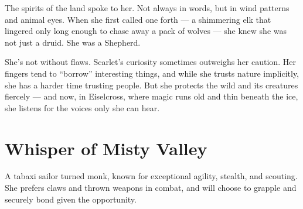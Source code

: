 \documentclass[
  letterpaper,12pt,twoside,twocolumn,openany,
  nodeprecatedcode,bg=full]{dndbook}
\begin{document}
The spirits of the land spoke to her. Not always in words, but in wind
patterns and animal eyes. When she first called one forth --- a
shimmering elk that lingered only long enough to chase away a pack of
wolves --- she knew she was not just a druid. She was a Shepherd.

She's not without flaws. Scarlet's curiosity sometimes outweighs her
caution. Her fingers tend to ``borrow'' interesting things, and while
she trusts nature implicitly, she has a harder time trusting people. But
she protects the wild and its creatures fiercely --- and now, in
Eiselcross, where magic runs old and thin beneath the ice, she listens
for the voices only she can hear.

\chapter{Whisper of Misty Valley}\label{whisper-of-misty-valley}

A tabaxi sailor turned monk, known for exceptional agility, stealth, and
scouting. She prefers claws and thrown weapons in combat, and will
choose to grapple and securely bond given the opportunity.
\end{document}

